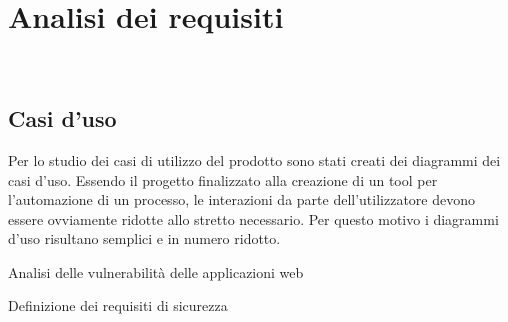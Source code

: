 \chapter{Analisi dei requisiti}
\label{cap:analisi-requisiti}

\\

\section{Casi d'uso}

Per lo studio dei casi di utilizzo del prodotto sono stati creati dei diagrammi dei casi d'uso. Essendo il progetto finalizzato alla creazione di un tool per l'automazione di un processo, le interazioni da parte dell'utilizzatore devono essere ovviamente ridotte allo stretto necessario. Per questo motivo i diagrammi d'uso risultano semplici e in numero ridotto.

\begin{usecase}{1}{Analisi delle vulnerabilità delle applicazioni web}
\label{uc:analisi-vulnerabilita}
\end{usecase}

\begin{usecase}{2}{Definizione dei requisiti di sicurezza}
\usecasepre{}
\usecasepost{}
\usecasedesc{}
\label{uc:}
\end{usecase}

\begin{usecase}{3}{}
\usecasepre{}
\usecasepost{}
\usecasedesc{}
\label{uc:}
\end{usecase}

\begin{usecase}{0}{}
\usecasepre{}
\usecasepost{}
\usecasedesc{}
\label{uc:}
\end{usecase}

